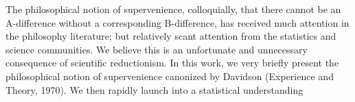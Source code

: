 

The philosophical notion of supervenience, colloquially, that there cannot be an A-difference without a corresponding B-difference, has received much attention in the philosophy literature; but relatively scant attention from the statistics and science communities.  We believe this is an unfortunate and unnecessary consequence of scientific reductionism.  In this work, we very briefly present the philosophical notion of supervenience canonized by Davidson (Experience and Theory, 1970).  We then rapidly launch into a statistical understanding